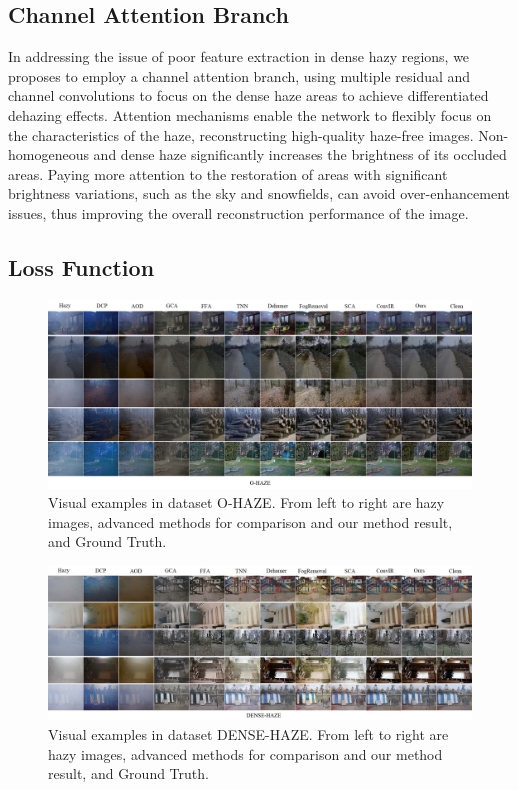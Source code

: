 \documentclass[journal]{IEEEtran}
\begin{document}
\subsection{Channel Attention Branch}
In addressing the issue of poor feature extraction in dense hazy regions, we proposes to employ a channel attention branch, using multiple residual and channel convolutions to focus on the dense haze areas to achieve differentiated dehazing effects.
Attention mechanisms enable the network to flexibly focus on the characteristics of the haze, reconstructing high-quality haze-free images. Non-homogeneous and dense haze significantly increases the brightness of its occluded areas. Paying more attention to the restoration of areas with significant brightness variations, such as the sky and snowfields, can avoid over-enhancement issues, thus improving the overall reconstruction performance of the image.

\subsection{Loss Function}

\begin{figure}[!t]
	\centering
	\includegraphics[width=7in]{O-HAZE-compare}
	\caption{Visual examples in dataset O-HAZE. From left to right are hazy images, advanced methods for comparison and our method result, and Ground Truth.}
	\label{fig6}
\end{figure}

\begin{figure}[!t]
	\centering
	\includegraphics[width=7in]{DENSE-HAZE-compare}
	\caption{Visual examples in dataset DENSE-HAZE. From left to right are hazy images, advanced methods for comparison and our method result, and Ground Truth.}
	\label{fig7}
\end{figure}
\end{document}
